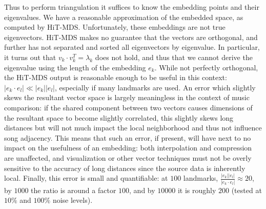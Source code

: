 \documentclass[10pt,fleqn,a4paper]{article}
\begin{document}
\begin{twocolumn}
Thus to perform triangulation it suffices to know the embedding points and their eigenvalues.  We have a reasonable approximation of the embedded space, as computed by HiT-MDS.  Unfortunately, these embeddings are not true eigenvectors.  HiT-MDS makes no guarantee that the vectors are orthogonal, and further has not separated and sorted all eigenvectors by eigenvalue.  In particular, it turns out that $v_k \cdot v_k^T = \lambda_k$ does not hold, and thus that we cannot derive the eigenvalue using the length of the embedding $e_k$.  While not perfectly orthogonal, the HiT-MDS output is reasonable enough to be useful in this context: $|e_k \cdot e_l| \ll |e_k||e_l|$, especially if many landmarks are used.  An error which slightly skews the resultant vector space is largely meaningless in the context of music comparison: if the shared component between two vectors causes dimensions of the resultant space to become slightly correlated, this slightly skews long distances but will not much impact the local neighborhood and thus not influence song adjacency.  This means that such an error, if present, will have next to no impact on the usefulness of an embedding: both interpolation and compression are unaffected, and visualization or other vector techniques must not be overly sensitive to the accuracy of long distances since the source data is inherently local.  Finally, this error is small and quantifiable: at $100$ landmarks, $\frac{|e_k||e_l|}{|e_k \cdot e_l|} \approx 20$, by $1000$ the ratio is around a factor $100$, and by $10000$ it is roughly $200$ (tested at $10\%$ and $100\%$ noise levels). 


\end{twocolumn}
\end{document}
